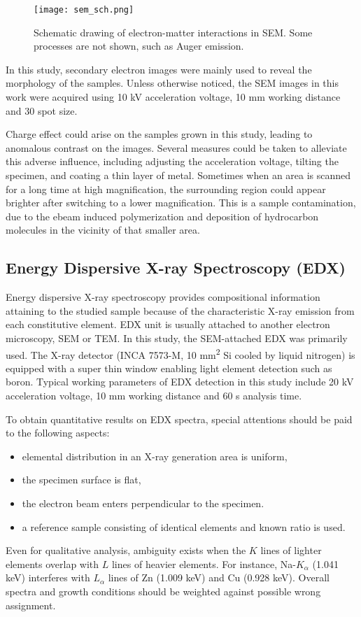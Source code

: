 \begin{figure}[htb]
\centering
\texttt{[image: sem\_sch.png]}
\caption[Schematic drawing of electron-matter interactions in SEM]{Schematic drawing of electron-matter interactions in SEM.\cite{Good2000} Some processes are not shown, such as Auger emission.}
\label{fig:ch2sem}
\end{figure}

In this study, secondary electron images were mainly used to reveal the morphology of the samples. Unless otherwise noticed, the SEM images in this work were acquired using 10 kV acceleration voltage, 10 mm working distance and 30 spot size.

Charge effect could arise on the samples grown in this study, leading to anomalous contrast on the images. Several measures could be taken to alleviate this adverse influence, including adjusting the acceleration voltage, tilting the specimen, and coating a thin layer of metal. Sometimes when an area is scanned for a long time at high magnification, the surrounding region could appear brighter after switching to a lower magnification. This is a sample contamination, due to the \gls{ebeam} induced polymerization and deposition of hydrocarbon molecules in the vicinity of that smaller area. 


\subsection{Energy Dispersive X-ray Spectroscopy (EDX)}\label{sec:edx}

Energy dispersive X-ray spectroscopy provides compositional information attaining to the studied sample because of the characteristic X-ray emission from each constitutive element. EDX unit is usually attached to another electron microscopy, SEM or TEM. In this study, the SEM-attached EDX was primarily used. The X-ray detector (INCA 7573-M, 10 \si{mm^2} Si cooled by liquid nitrogen) is equipped with a super thin window enabling light element detection such as boron. Typical working parameters of EDX detection in this study include 20 kV acceleration voltage, 10 mm working distance and 60 s analysis time.

To obtain quantitative results on EDX spectra, special attentions should be paid to the following aspects:
\begin{itemize}
\item elemental distribution in an X-ray generation area is uniform,
\item the specimen surface is flat,
\item the electron beam enters perpendicular to the specimen. 
\item a reference sample consisting of identical elements and known ratio is used. 
\end{itemize}
Even for qualitative analysis, ambiguity exists when the $K$ lines of lighter elements overlap with $L$ lines of heavier elements. For instance, Na-$K_\alpha$ (1.041 keV) interferes with $L_\alpha$ lines of Zn (1.009 keV) and Cu (0.928 keV). Overall spectra and growth conditions should be weighted against possible wrong assignment. 

